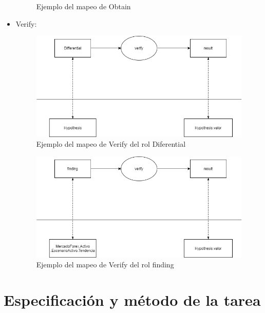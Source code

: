 \begin{itemize}
\begin{figure}[H]
    \caption{\label{fig:Obtain}Ejemplo del mapeo de Obtain}
  \end{figure}
  \item Verify:  
  \begin{figure}[H]
    \centering
    \includegraphics[scale=0.50]{imagenes/verify1.png}
    \caption{\label{fig:Verify}Ejemplo del mapeo de Verify del rol Diferential}
  \end{figure}
  \begin{figure}[H]
    \centering
    \includegraphics[scale=0.50]{imagenes/verify2.png}
    \caption{\label{fig:verify2}Ejemplo del mapeo de Verify del rol finding}
  \end{figure}
\end{itemize}

\section{Especificación y método de la tarea}